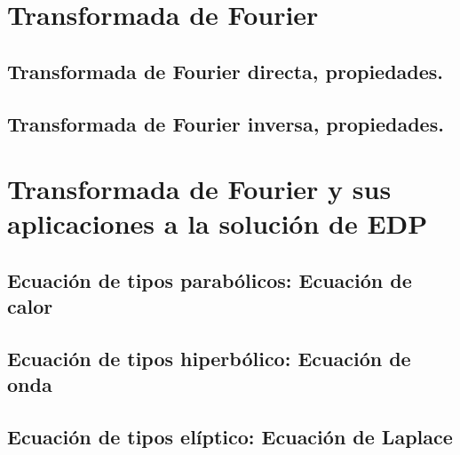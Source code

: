 \documentclass[a4paper,12pt,oneside]{memoir}
\begin{document}
	
	
	
	
	
	\tableofcontents
	
	
	
	
	\chapter{Transformada de Fourier}
	\startcontents[chapters]
	\printmyminitoc 
		
		\section{Transformada de Fourier directa, propiedades.}
		
		\section{Transformada de Fourier inversa, propiedades.}
		
	\stopcontents[chapters]
	
	\chapter{Transformada de Fourier y sus aplicaciones a la solución de EDP}
	\startcontents[chapters]
	\printmyminitoc
		
		\section{Ecuación de tipos parabólicos: Ecuación de calor}
		
		\section{Ecuación de tipos hiperbólico: Ecuación de onda}
		
		\section{Ecuación de tipos elíptico: Ecuación de Laplace}
		
	\stopcontents[chapters]
	
	
	
\end{document}
